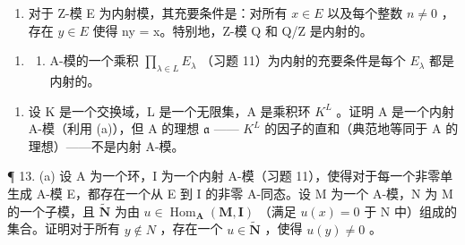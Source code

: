 \begin{enumerate}
\def\labelenumi{(\alph{enumi})}
\setcounter{enumi}{1}
\tightlist
\item
  对于 Z-模 E 为内射模，其充要条件是：对所有 \(x \in E\) 以及每个整数 \(n \neq 0\) ，存在 \(y \in E\) 使得 ny = x。特别地，Z-模 Q 和 Q/Z 是内射的。
\end{enumerate}

\begin{enumerate}
\def\labelenumi{\arabic{enumi}.}
\setcounter{enumi}{11}
\tightlist
\item
  \begin{enumerate}
  \def\labelenumii{(\alph{enumii})}
  \tightlist
  \item
    A-模的一个乘积 \(\prod_{\lambda \in L} E_{\lambda}\) （习题 11）为内射的充要条件是每个 \(E_{\lambda}\) 都是内射的。
  \end{enumerate}
\end{enumerate}

\begin{enumerate}
\def\labelenumi{(\alph{enumi})}
\setcounter{enumi}{1}
\tightlist
\item
  设 K 是一个交换域，L 是一个无限集，A 是乘积环 \(K^{L}\) 。证明 A 是一个内射 A-模（利用 (a)），但 A 的理想 \(\mathfrak{a}\) —— \(K^{L}\) 的因子的直和（典范地等同于 A 的理想）——不是内射 A-模。
\end{enumerate}

¶ 13. (a) 设 A 为一个环，I 为一个内射 A-模（习题 11），使得对于每一个非零单生成 A-模 E，都存在一个从 E 到 I 的非零 A-同态。设 M 为一个 A-模，N 为 M 的一个子模，且 \(\tilde{\mathbf{N}}\) 为由 \(u \in \operatorname{Hom}_{\mathbf{A}}(\mathbf{M}, \mathbf{I})\) （满足 \(u(x) = 0\) 于 N 中）组成的集合。证明对于所有 \(y \notin N\) ，存在一个 \(u \in \tilde{\mathbf{N}}\) ，使得 \(u(y) \neq 0\) 。

